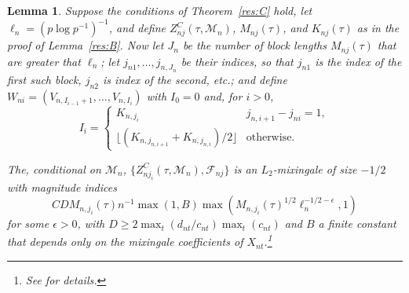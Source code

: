 \documentclass[12pt]{article}
\newtheorem{lema}{Lemma}[section]
\theoremstyle{definition}
\begin{document}
\begin{lema}\label{res:a5}
  Suppose the conditions of Theorem~\ref{res:C} hold, let $\ell_n = (p
  \log p^{-1})^{-1}$, and define $Z_{nj}^C(\tau, \mathcal{M}_n)$,
  $M_{nj}(\tau)$, and $K_{nj}(\tau)$ as in the proof of
  Lemma~\ref{res:B}. Now let $J_n$ be the number of block lengths
  $M_{nj}(\tau)$ that are greater that $\ell_n$; let $j_{n1},\dots,j_{n,J_n}$
  be their indices, so that $j_{n1}$ is the index of the first such
  block, $j_{n2}$ is index of the second, etc.; and define 
  $W_{ni} = (V_{n,I_{i-1}+1},\dots,V_{n,I_i})$
  with $I_0 = 0$ and, for $i > 0$,
  \begin{equation}
    I_i =
    \begin{cases}
      K_{n,j_i} & j_{n,i+1} - j_{ni} = 1, \\ 
      \lfloor (K_{n,j_{n,i+1}} + K_{n,j_{n,i}}) / 2 \rfloor & \text{otherwise.}
    \end{cases}
  \end{equation}

  The, conditional on $\mathcal{M}_n$, $\{Z_{nj_i}^C(\tau,
  \mathcal{M}_n), \mathcal{F}_{nj}\}$ is an $L_2$-mixingale of size
  $-1/2$ with magnitude indices
  \begin{equation}
    C D M_{n,j_i}(\tau) n^{-1} \max(1,B) \max(M_{n,j_i}(\tau)^{1/2}
    \ell_n^{-1/2-\epsilon}, 1)
  \end{equation}
  for some $\epsilon > 0$, with $D \geq 2 \max_t(d_{nt}/c_{nt})
  \max_t(c_{nt})$ and $B$ a finite constant that depends only on the
  mixingale coefficients of $X_{nt}$.\footnote{See
    \citet[Theorem~1.6]{Mcl:75} for details.}
\end{lema}
\end{document}
